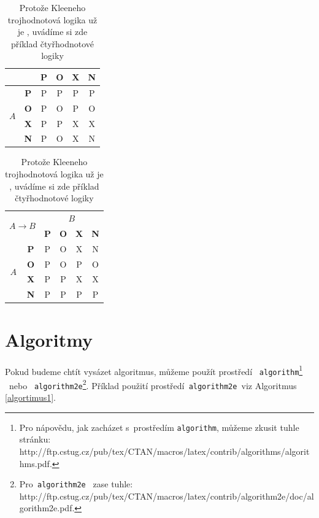 \documentclass[11pt,a4paper]{article}
\begin{document}
\begin{table}[h]
\begin{center}
\begin{tabular}{|c|c|c|c|c|c|}
    \multicolumn{2}{|c|}{} & \textbf{P} & \textbf{O} & \textbf{X} & \textbf{N}\\\hline
    \multirow{4}{*}{${A}$} & \textbf{P} & {P} & {P} & {P} & {P}\\\cline{2-6}
    & \textbf{O} & {P} & {O} & {P} & {O}\\\cline{2-6}
    & \textbf{X} & {P} & {P} & {X} & {X}\\\cline{2-6}
    & \textbf{N} & {P} & {O} & {X} & {N}\\\hline
\end{tabular}
\begin{tabular}{|c|c|c|c|c|c|}\hline
    \multicolumn{2}{|c|}{\multirow{2}{*}{${A}\rightarrow{B}$}} & \multicolumn{4}{c|}{$B$}\\\cline{3-6}
    \multicolumn{2}{|c|}{} & \textbf{P} & \textbf{O} & \textbf{X} & \textbf{N}\\\hline
    \multirow{4}{*}{${A}$} & \textbf{P} & {P} & {O} & {X} & {N}\\\cline{2-6}
    & \textbf{O} & {P} & {O} & {P} & {O}\\\cline{2-6}
    & \textbf{X} & {P} & {P} & {X} & {X}\\\cline{2-6}
    & \textbf{N} & {P} & {P} & {P} & {P}\\\hline
\end{tabular}
\caption{Protože Kleeneho trojhodnotová logika už je , uvádíme si zde příklad čtyřhodnotové logiky}\label{tabulka2} 
\end{center}
\end{table}
\pagebreak 

\section{Algoritmy}\label{algortimus}
Pokud budeme chtít vysázet algoritmus, můžeme použít prostředí \verb| algorithm|\footnote{
Pro nápovědu, jak zacházet s~prostředím \texttt{algorithm}, můžeme zkusit tuhle stránku:\\
http://ftp.cstug.cz/pub/tex/CTAN/macros/latex/contrib/algorithms/algorithms.pdf.} \ nebo 
\verb| algorithm2e|\footnote{Pro\texttt{ algorithm2e } zase tuhle: http://ftp.cstug.cz/pub/tex/CTAN/macros/latex/contrib/algorithm2e/doc/algorithm2e.pdf.}.
Příklad použití prostředí\verb| algorithm2e |viz Algoritmus \ref{algortimus1}.
\end{document}
